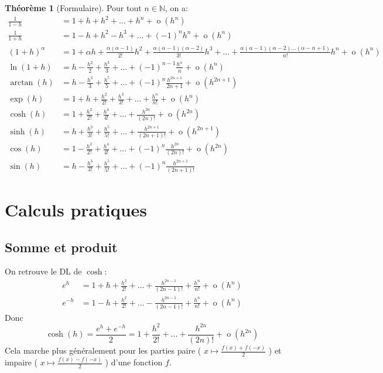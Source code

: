 \documentclass[10pt,a4paper]{article}
\theoremstyle{definition}
\newtheorem{theorem}[proposition]{Théorème}
\DeclareMathOperator*{\negl}{o}
\begin{document}
\begin{theorem}[Formulaire]
Pour tout $n \in \mathbb{N}$, on a:
\begin{align*}
\frac{1}{1 - h} &= 1 + h + h^2 + ... + h^n + \negl(h^n) \\
\frac{1}{1 + h} &= 1 - h + h^2 - h^3 + ... + (-1)^n h^n + \negl(h^n) \\
(1 + h)^\alpha &= 1 + \alpha h + \frac{\alpha (\alpha - 1)}{2!} h^2 + \frac{\alpha (\alpha - 1) (\alpha - 2)}{3!} h^3 + ... + \frac{\alpha (\alpha - 1) (\alpha - 2) ... (\alpha - n + 1)}{n!} h^n + \negl(h^n) \\
\ln(1 + h) &= h - \frac{h^2}{2} + \frac{h^3}{3} + ... + (-1)^{n - 1} \frac{h^n}{n} + \negl(h^n) \\
\arctan(h) &= h - \frac{h^3}{3} + \frac{h^5}{5} + ... + (-1)^n \frac{h^{2n + 1}}{2n + 1} + \negl(h^{2n + 1}) \\
\exp(h) &= 1 + h + \frac{h^2}{2!} + \frac{h^3}{3!} + ... + \frac{h^n}{n!} + \negl(h^n) \\
\cosh(h) &= 1 + \frac{h^2}{2!} + \frac{h^4}{4!} + ... + \frac{h^{2n}}{(2n)!} + \negl(h^{2n}) \\
\sinh(h) &= h + \frac{h^3}{3!} + \frac{h^5}{5!} + ... + \frac{h^{2n + 1}}{(2n + 1)!} + \negl(h^{2n + 1}) \\
\cos(h) &= 1 - \frac{h^2}{2!} + \frac{h^4}{4!} + ... + (-1)^n \frac{h^{2n}}{(2n)!} + \negl(h^{2n}) \\
\sin(h) &= h - \frac{h^3}{3!} + \frac{h^5}{5!} + ... + (-1)^n \frac{h^{2n + 1}}{(2n + 1)!}
\end{align*}
\end{theorem}

\section{Calculs pratiques}
\subsection{Somme et produit}
On retrouve le DL de $\cosh$:
\begin{align*}
e^h &= 1 + h + \frac{h^2}{2!} + ... + \frac{h^{2n - 1}}{(2n - 1)!} + \frac{h^n}{n!} + \negl(h^n) \\
e^{-h} &= 1 - h + \frac{h^2}{2!} + ... - \frac{h^{2n - 1}}{(2n -1)!} + \frac{h^n}{n!} + \negl(h^n)
\end{align*}
Donc 
\[ \cosh(h) = \frac{e^h + e^{-h}}{2} = 1 + \frac{h^2}{2!} + ... + \frac{h^{2n}}{(2n)!} + \negl(h^{2n}) \]
Cela marche plus généralement pour les parties paire ( $x \mapsto \frac{f(x) + f(-x)}{2}$ ) et impaire ( $x \mapsto \frac{f(x) - f(-x)}{2}$ ) d'une fonction $f$. \medskip
\end{document}
